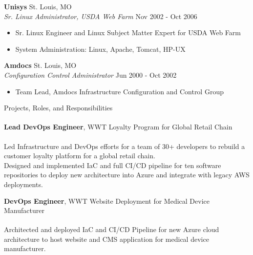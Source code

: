 \documentclass[letterpaper]{article}
\newcommand{\lineunder} {
    \vspace*{-8pt} \\
    \hspace*{-18pt} \hrulefill \\
}
\newcommand{\header} [1] {
    {\hspace*{-18pt}\vspace*{6pt} #1}
    \vspace*{-6pt} \lineunder
}
\begin{document}
\textbf{Unisys} \hfill St. Louis, MO\\
\textit{Sr. Linux Administrator, USDA Web Farm} \hfill Nov 2002 - Oct 2006\\
\vspace{-1mm}
\begin{itemize}
	\item Sr. Linux Engineer and Linux Subject Matter Expert for USDA Web Farm
	\item System Administration: Linux, Apache, Tomcat, HP-UX
\end{itemize}

\textbf{Amdocs} \hfill St. Louis, MO\\
\textit{Configuration Control Administrator} \hfill Jun 2000 - Oct 2002\\
\vspace{-1mm}
\begin{itemize}
	\item Team Lead, Amdocs Infrastructure Configuration and Control Group
\end{itemize}

\pagebreak

\header{Projects, Roles, and Responsibilities}

{\textbf{Lead DevOps Engineer}, WWT Loyalty Program for Global Retail Chain} \\
\hspace{5mm}{\sl (Terraform, Microsoft Azure, Azure DevOps, Amazon AWS)} \\
Led Infrastructure and DevOps efforts for a team of 30+ developers to rebuild
  a customer loyalty platform for a global retail chain. \\
Designed and implemented IaC and full CI/CD pipeline for ten software
  repositories to deploy new architecture into Azure and integrate with legacy
  AWS deployments.\\
\vspace*{2mm}

{\textbf{DevOps Engineer}, WWT Website Deployment for Medical Device Manufacturer} \\
\hspace{5mm}{\sl (Terraform, Ansible, Microsoft Azure, Azure DevOps)} \\
Architected and deployed IaC and CI/CD Pipeline for new Azure cloud
  architecture to host website and CMS application for medical device
  manufacturer.\\
\vspace*{2mm}
\end{document}
